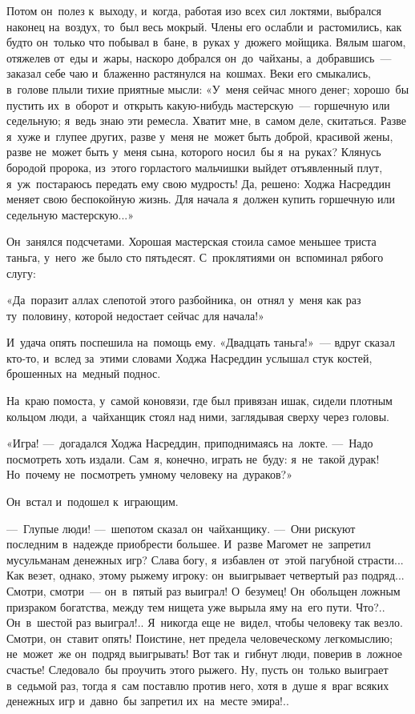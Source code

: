 \documentclass[12pt,a4paper]{book}
\begin{document}
Потом он~полез к~выходу, и~когда, работая изо всех сил локтями, выбрался наконец на~воздух, то~был весь мокрый. Члены его ослабли и~растомились, как будто он~только что побывал в~бане, в~руках у~дюжего мойщика. Вялым шагом, отяжелев от~еды и~жары, наскоро добрался он~до~чайханы, а~добравшись~— заказал себе чаю и~блаженно растянулся на~кошмах. Веки его смыкались, в~голове плыли тихие приятные мысли: «У~меня сейчас много денег; хорошо~бы пустить их~в~оборот и~открыть какую-нибудь мастерскую~— горшечную или седельную; я~ведь знаю эти ремесла. Хватит мне, в~самом деле, скитаться. Разве я~хуже и~глупее других, разве у~меня не~может быть доброй, красивой жены, разве не~может быть у~меня сына, которого носил~бы я~на~руках? Клянусь бородой пророка, из~этого горластого мальчишки выйдет отъявленный плут, я~уж~постараюсь передать ему свою мудрость! Да, решено: Ходжа Насреддин меняет свою беспокойную жизнь. Для начала я~должен купить горшечную или седельную мастерскую...»

Он~занялся подсчетами. Хорошая мастерская стоила самое меньшее триста таньга, у~него~же было сто пятьдесят. С~проклятиями он~вспоминал рябого слугу:

«Да~поразит аллах слепотой этого разбойника, он~отнял у~меня как раз ту~половину, которой недостает сейчас для начала!»

И~удача опять поспешила на~помощь ему. «Двадцать таньга!»~— вдруг сказал кто-то, и~вслед за~этими словами Ходжа Насреддин услышал стук костей, брошенных на~медный поднос.

На~краю помоста, у~самой коновязи, где был привязан ишак, сидели плотным кольцом люди, а~чайханщик стоял над ними, заглядывая сверху через головы.

«Игра! —~догадался Ходжа Насреддин, приподнимаясь на~локте. —~Надо посмотреть хоть издали. Сам~я, конечно, играть не~буду: я~не~такой дурак! Но~почему не~посмотреть умному человеку на~дураков?»

Он~встал и~подошел к~играющим.

—~Глупые люди! —~шепотом сказал он~чайханщику. —~Они рискуют последним в~надежде приобрести большее. И~разве Магомет не~запретил мусульманам денежных игр? Слава богу, я~избавлен от~этой пагубной страсти... Как везет, однако, этому рыжему игроку: он~выигрывает четвертый раз подряд... Смотри, смотри~— он~в~пятый раз выиграл! О~безумец! Он~обольщен ложным призраком богатства, между тем нищета уже вырыла яму на~его пути. Что?.. Он~в~шестой раз выиграл!.. Я~никогда еще не~видел, чтобы человеку так везло. Смотри, он~ставит опять! Поистине, нет предела человеческому легкомыслию; не~может~же он~подряд выигрывать! Вот так и~гибнут люди, поверив в~ложное счастье! Следовало~бы проучить этого рыжего. Ну, пусть он~только выиграет в~седьмой раз, тогда я~сам поставлю против него, хотя в~душе я~враг всяких денежных игр и~давно~бы запретил их~на~месте эмира!..
\end{document}
